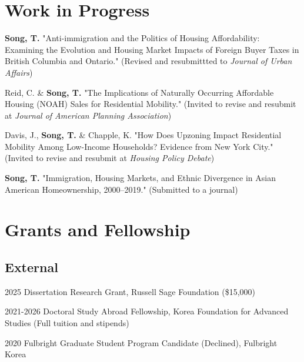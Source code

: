 \documentclass[11pt,letterpaper]{report}
\newcommand{\listitemspace}{0.4em}
\renewenvironment{itemize}
{\begin{list}{}{\setlength{\leftmargin}{0.5em}
\setlength{\parskip}{0em}
\setlength{\itemsep}{\listitemspace}
\setlength{\parsep}{\listitemspace}}}
{\end{list}}
\begin{document}
\section*{Work in Progress}
\begin{itemize}
\setlength{\itemsep}{-0.0em}
\item \textbf{Song, T.} "Anti-immigration and the Politics of Housing Affordability: Examining the Evolution and Housing Market Impacts of Foreign Buyer Taxes in British Columbia and Ontario." (Revised and resubmittted to \emph{Journal of Urban Affairs})
\item Reid, C. \& \textbf{Song, T.} "The Implications of Naturally Occurring Affordable Housing (NOAH) Sales for Residential Mobility." (Invited to revise and resubmit at \emph{Journal of American Planning Association})
\item Davis, J., \textbf{Song, T.} \& Chapple, K. "How Does Upzoning Impact Residential Mobility Among Low-Income Households? Evidence from New York City." (Invited to revise and resubmit at \emph{Housing Policy Debate})
\item \textbf{Song, T.} "Immigration, Housing Markets, and Ethnic Divergence in Asian American Homeownership, 2000–2019." (Submitted to a journal)
\end{itemize}


\section*{Grants and Fellowship}
\subsection*{External}
\begin{tablist}
\item[2025] \tab{}Dissertation Research Grant, Russell Sage Foundation (\$15,000)
\item[2021-2026] \tab{}Doctoral Study Abroad Fellowship, Korea Foundation for Advanced Studies (Full tuition and stipends)
\item[2020] \tab{}Fulbright Graduate Student Program Candidate (Declined), Fulbright Korea
\end{tablist}
\end{document}
